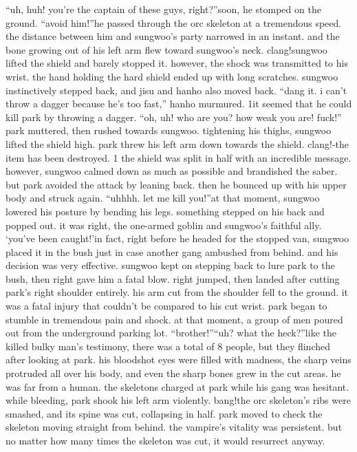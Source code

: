 “uh, huh! you’re the captain of these guys, right?”soon, he stomped on the ground.
“avoid him!”he passed through the orc skeleton at a tremendous speed.
 the distance between him and sungwoo’s party narrowed in an instant.
 and the bone growing out of his left arm flew toward sungwoo’s neck.
clang!sungwoo lifted the shield and barely stopped it.
 however, the shock was transmitted to his wrist.
 the hand holding the hard shield ended up with long scratches.
sungwoo instinctively stepped back, and jisu and hanho also moved back.
“dang it.
 i can’t throw a dagger because he’s too fast,” hanho murmured.
1it seemed that he could kill park by throwing a dagger.
“oh, uh! who are you? how weak you are! fuck!” park muttered, then rushed towards sungwoo.
tightening his thighs, sungwoo lifted the shield high.
 park threw his left arm down towards the shield.
clang!-the item has been destroyed.
1
the shield was split in half with an incredible message.
 however, sungwoo calmed down as much as possible and brandished the saber.
but park avoided the attack by leaning back.
 then he bounced up with his upper body and struck again.
“uhhhh.
 let me kill you!”at that moment, sungwoo lowered his posture by bending his legs.
 something stepped on his back and popped out.
 it was right, the one-armed goblin and sungwoo’s faithful ally.
‘you’ve been caught!’in fact, right before he headed for the stopped van, sungwoo placed it in the bush just in case another gang ambushed from behind.
 and his decision was very effective.
sungwoo kept on stepping back to lure park to the bush, then right gave him a fatal blow.
right jumped, then landed after cutting park’s right shoulder entirely.
his arm cut from the shoulder fell to the ground.
 it was a fatal injury that couldn’t be compared to his cut wrist.
 park began to stumble in tremendous pain and shock.
at that moment, a group of men poured out from the underground parking lot.
“brother!”“uh? what the heck?”like the killed bulky man’s testimony, there was a total of 8 people, but they flinched after looking at park.
his bloodshot eyes were filled with madness, the sharp veins protruded all over his body, and even the sharp bones grew in the cut areas.
 he was far from a human.
the skeletons charged at park while his gang was hesitant.
while bleeding, park shook his left arm violently.
bang!the orc skeleton’s ribs were smashed, and its spine was cut, collapsing in half.
park moved to check the skeleton moving straight from behind.
the vampire’s vitality was persistent.
 but no matter how many times the skeleton was cut, it would resurrect anyway.
